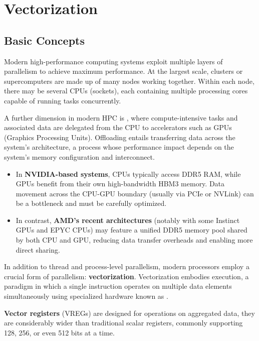 \chapter{Vectorization}

\section{Basic Concepts}

Modern high-performance computing systems exploit multiple layers of parallelism to achieve maximum performance. At the largest scale, clusters or supercomputers are made up of many nodes working together. Within each node, there may be several CPUs (sockets), each containing multiple processing cores capable of running tasks concurrently.

A further dimension in modern HPC is , where compute-intensive tasks and associated data are delegated from the CPU to accelerators such as GPUs (Graphics Processing Units). Offloading entails transferring data across the system's architecture, a process whose performance impact depends on the system's memory configuration and interconnect.

\begin{itemize}
  \item In \textbf{NVIDIA-based systems}, CPUs typically access DDR5 RAM, while GPUs benefit from their own high-bandwidth HBM3 memory. Data movement across the CPU-GPU boundary (usually via PCIe or NVLink) can be a bottleneck and must be carefully optimized.
  \item In contrast, \textbf{AMD's recent architectures} (notably with some Instinct GPUs and EPYC CPUs) may feature a unified DDR5 memory pool shared by both CPU and GPU, reducing data transfer overheads and enabling more direct sharing.
\end{itemize}

In addition to thread and process-level parallelism, modern processors employ a crucial form of parallelism: \textbf{vectorization}. Vectorization embodies  execution, a paradigm in which a single instruction operates on multiple data elements simultaneously using specialized hardware known as .

\textbf{Vector registers} (VREGs) are designed for operations on aggregated data, they are considerably wider than traditional scalar registers, commonly supporting 128, 256, or even 512 bits at a time.

